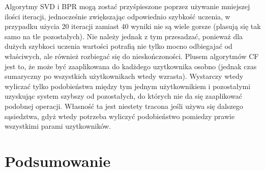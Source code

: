 \documentclass{pracamgr}
\begin{document}
    Algorytmy SVD i BPR mogą zostać przyśpieszone poprzez używanie mniejszej ilości iteracji, jednocześnie zwiększając odpowiednio szybkość uczenia,
    w przypadku użycia 20 iteracji zamiast 40 wyniki nie są wiele gorsze (plasują się tak samo na tle pozostałych). Nie należy jednak z tym przesadzać,
    ponieważ dla dużych szybkoci uczenia wartości potrafią nie tylko mocno odbiegajać od właściwych, ale również rozbiegać się do nieskończoności.
    Plusem algorytmów CF jest to, że może być zaaplikowana do kadżdego uzytkownika osobno (jednak czas sumaryczny po wszystkich użytkownikach wtedy wzrasta).
    Wystarczy wtedy wyliczać tylko podobieństwa między tym jednym użytkownikiem i pozostałymi uzyskując system szybszy od pozostałych,
    do których nie da się zaaplikować podobnej operacji. Własność ta jest niestety tracona jeśli używa się dalszego sąsiedztwa, gdyż wtedy potrzeba wyliczyć
    podobieństwo pomiedzy prawie wszystkimi parami uzytkowników.
   \section{Podsumowanie}
    
\end{document}
